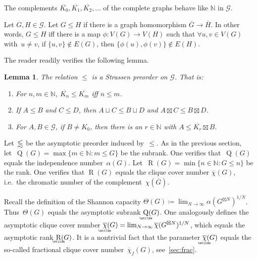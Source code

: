 \documentclass[a4paper, fleqn]{amsart}
\theoremstyle{plain}
\newtheorem{lemma}[theorem]{Lemma}
\theoremstyle{definition}
\newcommand{\regularize}[1]{\underaccent{\wtilde}{#1}}
\DeclareMathOperator{\rank}{R}
\DeclareMathOperator{\subrank}{Q}
\DeclareMathOperator{\asymprank}{\underaccent{\wtilde}{R}}
\DeclareMathOperator{\asympsubrank}{\underaccent{\wtilde}{Q}}
\newcommand{\NN}{\mathbb{N}}
\newcommand{\jeroen}[1]{#1}
\let\leqx\leqslant
\newcommand{\asympleqx}{%
  \mathrel{%
    \vphantom{\leqslant}%
    \smash{\vcenter{\doasympleqx}}%
  }%
}
\newcommand{\doasympleqx}{%
  \hbox{\ooalign{%
    \noalign{\kern.25ex}
    $\leqslant$\cr
    \noalign{\kern1.25ex}
    \smash{$\sim$}\cr
  }}%
}
\newcommand{\graphs}{\mathcal{G}}
\let\leqx\leqslant
\begin{document}
The complements $\overline{K_0}, \overline{K_1}, \overline{K_2}, \ldots$ of the complete graphs behave like $\NN$ in $\graphs$.

%

Let $G, H \in \graphs$. Let $G \leqx H$ if there is a graph homomorphism $\overline{G} \to \overline{H}$. In other words, $G \leqx H$ iff there is a map $\phi : V(G) \to V(H)$ such that $\forall u, v \in V(G)$ with~$u\neq v$, if $\{u,v\} \not\in E(G)$, then $\{\phi(u), \phi(v)\} \not\in E(H)$.

%
%
%
\jeroen{The reader readily verifies the following lemma.}
\begin{lemma}\label{lem2}
The relation $\leqx$ is a Strassen preorder on $\graphs$. That is: %
\begin{enumerate}[label=\upshape(\roman*)]
\item For $n, m \in \NN$, $\overline{K_n} \leqx \overline{K_m}$ iff $n \leq m$.\label{grpr_i}
\item If $A \leqx B$ and $C \leqx D$, then $A\sqcup C \leqx B\sqcup D$ and $A\boxtimes C \leqx B\boxtimes D$.\label{welldef}\label{grpr_ii} %
\item For $A,B \in \graphs$, if $B \neq K_0$, then there is an $r \in \NN$ with $A \leqx \overline{K_r} \boxtimes B$.\label{grpr_iii}
\end{enumerate}
\end{lemma}
%
%
%
%
%
%
%
%
%
%
%
%
%
%
%
%
%
%
%
%
%
%
%
%
%
%
%
%
%
%
%
%

Let~$\asympleqx$ be the asymptotic preorder induced by~$\leqx$.
As in the previous section, let~$\subrank(G) = \max \{m \in \NN : m \leqx G\}$ be the subrank. One verifies that~$\subrank(G)$ equals the independence number~$\alpha(G)$. %
%
Let~$\rank(G) = \min\{ n \in \NN : G \leqx n\}$ be the rank. One verifies that $\rank(G)$ equals the clique cover number $\overline{\chi}(G)$, i.e.~the chromatic number of the complement~$\chi(\overline{G})$.

Recall the definition of the Shannon capacity $\Theta(G) \coloneqq \lim_{N \to \infty} \alpha(G^{\boxtimes N})^{1/N}$. Thus~$\Theta(G)$ equals the asymptotic subrank $\asympsubrank(G)$.
%
One analogously defines the asymptotic clique cover number $\regularize{\overline{\chi}}(G) = \lim_{N \to \infty}\overline{\chi}(G^{\boxtimes N})^{1/N}$, which equals the asymptotic rank $\asymprank(G)$.
It is a nontrivial fact that the parameter $\regularize{\overline{\chi}}(G)$ equals the so-called fractional clique cover number~$\overline{\chi}_f(G)$, see~\cref{sec:frac}. %
\end{document}

